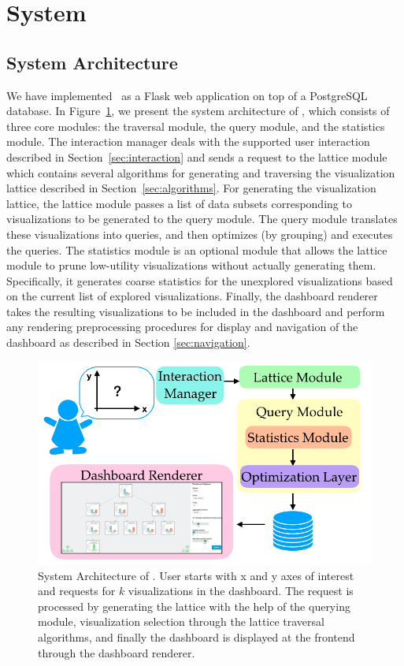 \section{System\label{sec:system}}
\subsection{System Architecture}
We have implemented \system\ as a Flask web application on top of a PostgreSQL database. In Figure~\ref{system_architecture}, we present the system architecture of \system, which consists of three core modules: the traversal module, the query module, and the statistics module. The interaction manager deals with the supported user interaction described in Section~\ref{sec:interaction} and sends a request to the lattice module which  contains several algorithms for generating and traversing the visualization lattice described in Section~\ref{sec:algorithms}. For generating the visualization lattice, the lattice module passes a list of data subsets corresponding to visualizations to be generated to the query module. The query module translates these visualizations into queries, and then optimizes (by grouping) and executes the queries. The statistics module is an optional module that allows the lattice module to prune low-utility visualizations without actually generating them. Specifically, it generates coarse statistics for the unexplored visualizations based on the current list of explored visualizations. Finally, the dashboard renderer takes the resulting visualizations to be included in the dashboard and perform any rendering preprocessing procedures for display and navigation of the dashboard as described in Section \ref{sec:navigation}.
\begin{figure}[ht!]
\centering
\includegraphics[width=\linewidth]{figures/system_architecture.png}
\caption{System Architecture of \system. User starts with x and y axes of interest and requests for $k$ visualizations in the dashboard. The request is processed by generating the lattice with the help of the querying module, visualization selection through the lattice traversal algorithms, and finally the dashboard is displayed at the frontend through the dashboard renderer. }%
\label{system_architecture}
\end{figure}

